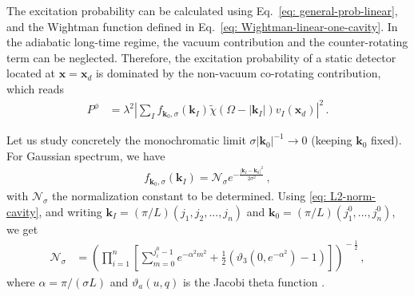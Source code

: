 \documentclass[11pt,prd,onecolumn,superscriptaddress,nofootinbib,floatfix,amsmath,amssymb]{revtex4-2}
\newcommand{\bx}{\bm{x}}
\newcommand{\bk}{{\bm{k}}}
\newcommand{\NN}{\mathcal{N}}
\begin{document}
    The excitation probability can be calculated using Eq.~\eqref{eq: general-prob-linear}, and the Wightman function defined in Eq.~\eqref{eq: Wightman-linear-one-cavity}. 
    In the adiabatic long-time regime, the vacuum contribution and the counter-rotating term can be neglected. Therefore, the excitation probability of a static detector located at $\bx=\bx_d$ is dominated by the non-vacuum co-rotating contribution, which reads
    \begin{align}
        P^\phi &= \lambda^2 \left|\sum_{I}f_{\bk_0,\sigma}(\bk_I)\tilde\chi(\Omega-|\bk_I|)v_I(\bx_d)\right|^2\,.
    \end{align}
    

    
    Let us study concretely the monochromatic limit \mbox{$\sigma |\bk_0|^{-1} \to 0$} (keeping $\bk_0$ fixed). For Gaussian spectrum, we have
    \begin{align}
        f_{\bk_0,\sigma}(\bk_I) = \NN_{\sigma}e^{-\frac{|\bk_I-\bk_0|^2}{2\sigma^2}}\,,
    \end{align}
    with $\NN_\sigma$ the normalization constant to be determined. Using \eqref{eq: L2-norm-cavity}, and writing $\bk_I = (\pi/L)(j_1,j_2,...,j_n)$ and $\bk_0 = (\pi/L)(j_1^0,...,j_n^0)$, we get
    \begin{align}
        \NN_\sigma &= \left(\prod_{i=1}^{n} \left[\sum_{m=0}^{j^0_i-1} e^{ -\alpha^2 m^2}+\frac{1}{2} \left(\vartheta _3(0,e^{-\alpha^2})-1\right)\right]\right)^{\!\!-\frac{1}{2}}\!\!\!\,,
    \end{align}
    where $\alpha = \pi/(\sigma L)$ and $\vartheta_a(u,q)$ is the Jacobi theta function \cite{NIST:DLMF}. 
    
\end{document}

